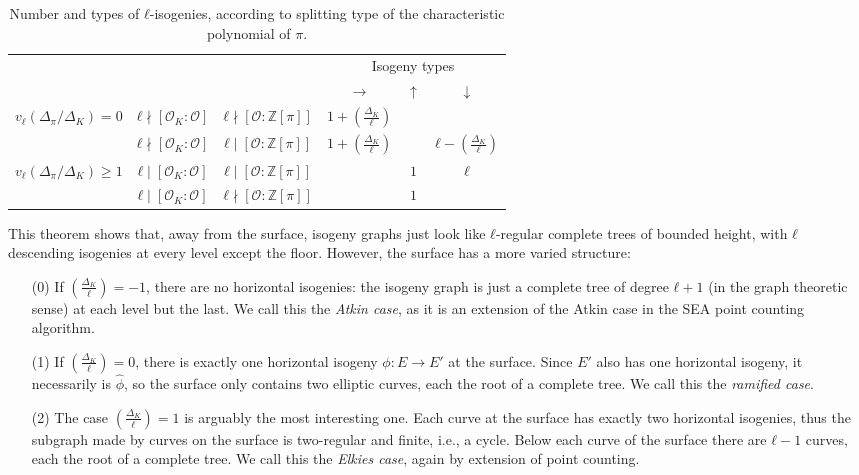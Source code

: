\documentclass[10pt]{article}
\theoremstyle{plain}
\theoremstyle{definition}
\def\O{\ensuremath{\mathcal{O}}}
\newcommand{\leg}[2]{\left(\frac{#1}{#2}\right)}
\begin{document}
\begin{table}
  \centering
  \def\arraystretch{1.3}
  \begin{tabular}{c | c | c | c c c}
    \multicolumn{3}{c|}{} & \multicolumn{3}{c}{Isogeny types}\\
    \multicolumn{3}{c|}{} & $→$ & $↑$ & $↓$\\
    \hline
    $v_ℓ(Δ_π/Δ_K)=0$ & $ℓ\nmid[\O_K:\O]$ & $ℓ\nmid[\O:ℤ[π]]$ & $1+\leg{Δ_K}{ℓ}$& &\\
    \hline
    & $ℓ\nmid[\O_K:\O]$ & $ℓ\mid[\O:ℤ[π]]$ &$1+\leg{Δ_K}{ℓ}$& &$ℓ-\leg{Δ_K}{ℓ}$\\
    $v_ℓ(Δ_π/Δ_K)≥1$ & $ℓ\mid[\O_K:\O]$ & $ℓ\mid[\O:ℤ[π]]$ &  &$1$&$ℓ$\\
    & $ℓ\mid[\O_K:\O]$ & $ℓ\nmid[\O:ℤ[π]]$ & &$1$& 
  \end{tabular}
  \caption{Number and types of $ℓ$-isogenies, according to splitting
    type of the characteristic polynomial of $π$.}
  \label{tab:periodic-table}
\end{table}

This theorem shows that, away from the surface, isogeny graphs just
look like $ℓ$-regular complete trees of bounded height, with $ℓ$
descending isogenies at every level except the floor. %
However, the surface has a more varied structure:
\begin{itemize}
\item[(0)] If $\leg{Δ_K}{ℓ}=-1$, there are no horizontal isogenies:
  the isogeny graph is just a complete tree of degree $ℓ+1$ (in the
  graph theoretic sense) at each level but the last. %
  We call this the \emph{Atkin case}, as it is an extension of the
  Atkin case in the SEA point counting algorithm.
\item[(1)] If $\leg{Δ_K}{ℓ}=0$, there is exactly one horizontal
  isogeny $ϕ:E→E'$ at the surface. %
  Since $E'$ also has one horizontal isogeny, it necessarily is
  $\hat{ϕ}$, so the surface only contains two elliptic curves, each
  the root of a complete tree. %
  We call this the \emph{ramified case}.
\item[(2)] The case $\leg{Δ_K}{ℓ}=1$ is arguably the most interesting
  one. %
  Each curve at the surface has exactly two horizontal isogenies, thus
  the subgraph made by curves on the surface is two-regular and
  finite, i.e., a cycle. %
  Below each curve of the surface there are $ℓ-1$ curves, each the
  root of a complete tree. %
  We call this the \emph{Elkies case}, again by extension of point
  counting. %
\end{itemize}
\end{document}
